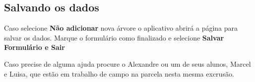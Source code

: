 \documentclass[a4paper, oneside, 10pt]{article}
\begin{document}
\subsection{Salvando os dados}
\label{sec:salva}


Caso selecione \textbf{Não adicionar} nova árvore o aplicativo abrirá a página para salvar os dados. Marque o formulário como finalizado e selecione \textbf{Salvar Formulário e Sair}  


Caso precise de alguma ajuda procure o Alexandre ou um de seus alunos, Marcel e Luisa, que estão em trabalho de campo na parcela nesta mesma excrusão.
\end{document}
